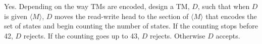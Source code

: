 Yes.
Depending on the way TMs are encoded,
design a TM, $D$, such that when $D$ is given $\langle M \rangle$,
$D$ moves the
read-write head to
the section of $\langle M \rangle$ that encodes the set of states
and begin counting the number of states.
If the counting stops before 42, $D$ rejects.
If the counting goes up to 43, $D$ rejects.
Otherwise $D$ accepts.
